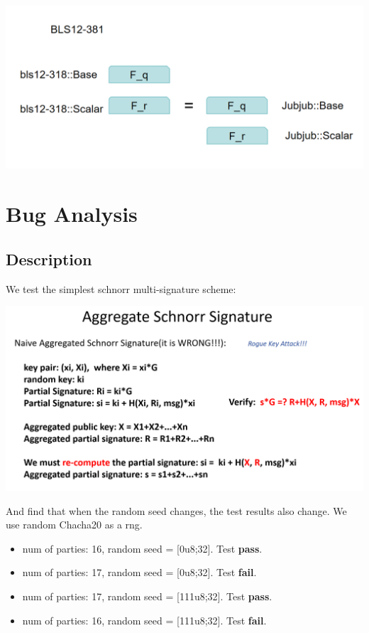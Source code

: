 \documentclass{article}
\begin{document}
\includegraphics[width=1\linewidth]{base_scalar.png}


\section{Bug Analysis}

\subsection{Description}

We test the simplest schnorr multi-signature scheme:

\includegraphics[width=1\linewidth]{schnorr multisig v1.png}

And find that when the random seed changes, the test results also change.
We use random Chacha20 as a rng.
\begin{itemize}
    \item num of parties: 16, random seed = [0u8;32]. Test \textbf{pass}.
    \item num of parties: 17, random seed = [0u8;32]. Test \textbf{fail}.
    \item num of parties: 17, random seed = [111u8;32]. Test \textbf{pass}.
    \item num of parties: 16, random seed = [111u8;32]. Test \textbf{fail}.
\end{itemize}
\end{document}
